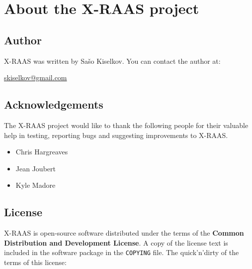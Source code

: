 \documentclass[a4paper,12pt]{article}
\begin{document}
\section{About the X-RAAS project}
\label{sec:About}

\subsection{Author}

X-RAAS was written by Sašo Kiselkov. You can contact the author at:

\vspace{1em}

\href{mailto:skiselkov@gmail.com}{skiselkov@gmail.com}

\subsection{Acknowledgements}

The X-RAAS project would like to thank the following people for their
valuable help in testing, reporting bugs and suggesting improvements to
X-RAAS.

\begin{itemize}

\item Chris Hargreaves

\item Jean Joubert

\item Kyle Madore

\end{itemize}

\subsection{License}

X-RAAS is open-source software distributed under the terms of the
\textbf{Common Distribution and Development License}. A copy of the
license text is included in the software package in the \texttt{COPYING}
file. The quick'n'dirty of the terms of this license:
\end{document}
